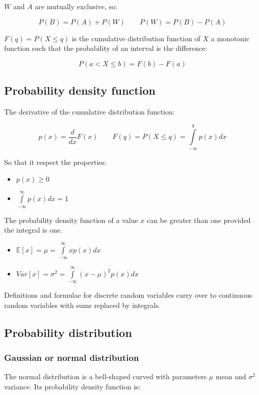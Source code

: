 	$W$ and $A$ are mutually exclusive, so:

	$$P(B) = P(A) + P(W) \qquad P(W) = P(B) - P(A)$$

	$F(q) = P(X\le q)$ is the cumulative distribution function of $X$ a monotonic function such that the probability of an interval is the difference:

	$$P(a < X \le b) = F(b) - F(a)$$

	\subsection{Probability density function}
	The derivative of the cumulative distribution function:

	$$p(x) = \frac{d}{dx}F(x)\qquad F(q) = P(X\le q) = \int\limits_{-\infty}^q p(x)dx$$

	So that it respect the properties:

	\begin{multicols}{2}
		\begin{itemize}
			\item $p(x) \ge 0$
			\item $\int\limits_{-\infty}^\infty p(x)dx = 1$
		\end{itemize}
	\end{multicols}

	The probability density function of a value $x$ can be greater than one provided the integral is one.

	\begin{multicols}{2}
		\begin{itemize}
			\item $\mathbb{E}[x] = \mu = \int\limits_{-\infty}^\infty xp(x)dx$
			\item $Var[x] = \sigma^2 = \int\limits_{-\infty}^\infty (x-\mu)^2p(x)dx$
		\end{itemize}
	\end{multicols}

	Definitions and formulae for discrete random variables carry over to continuous random variables with sums replaced by integrals.

	\subsection{Probability distribution}

		\subsubsection{Gaussian or normal distribution}
		The normal distribution is a bell-shaped curved with parameters $\mu$ mean and $\sigma^2$ variance.
		Its probability density function is:

